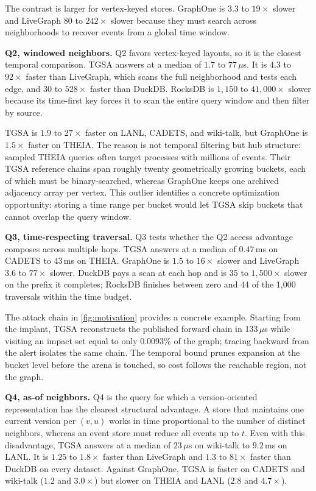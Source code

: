 \documentclass[sigconf,nonacm]{acmart}
\newcommand{\sys}{TGSA\xspace}
\begin{document}
The contrast is larger for vertex-keyed stores. GraphOne is $3.3$ to
$19\times$ slower and LiveGraph $80$ to $242\times$ slower because
they must search across neighborhoods to recover events from a global
time window.

\textbf{Q2, windowed neighbors.} Q2 favors vertex-keyed layouts, so it
is the closest temporal comparison. \sys answers at a median of
$1.7$ to $77$\,$\mu$s. It is $4.3$ to $92\times$ faster than LiveGraph,
which scans the full neighborhood and tests each edge, and $30$ to
$528\times$ faster than DuckDB. RocksDB is $1{,}150$ to $41{,}000\times$ slower
because its time-first key forces it to scan the entire query window
and then filter by source.

\sys is $1.9$ to
$27\times$ faster on LANL, CADETS, and wiki-talk, but GraphOne is
$1.5\times$ faster on THEIA. The reason is not temporal filtering but
hub structure: sampled THEIA queries often target processes with
millions of events. Their \sys reference chains span roughly twenty
geometrically growing buckets, each of which must be binary-searched,
whereas GraphOne keeps one archived adjacency array per vertex. This
outlier identifies a concrete optimization opportunity: storing a time
range per bucket would let \sys skip buckets that cannot overlap the
query window.

\textbf{Q3, time-respecting traversal.} Q3 tests whether the Q2 access
advantage composes across multiple hops. \sys answers at a median of
$0.47$\,ms on CADETS to $43$\,ms on THEIA. GraphOne is $1.5$ to
$16\times$ slower and LiveGraph $3.6$ to $77\times$ slower. DuckDB
pays a scan at each hop and is $35$ to $1{,}500\times$ slower on the
prefix it completes; RocksDB finishes between zero and 44 of the
1{,}000 traversals within the time budget.

The attack chain in \cref{fig:motivation} provides a concrete example.
Starting from the implant, \sys reconstructs the published forward
chain in 133\,$\mu$s while visiting an impact set equal to only
0.0093\% of the graph; tracing backward from the alert isolates the
same chain. The temporal bound prunes expansion at the bucket level before
the arena is touched, so cost follows the reachable region, not the
graph.

\textbf{Q4, as-of neighbors.} Q4 is the query for which a
version-oriented representation has the clearest structural advantage.
A store that maintains one current version per $(v,u)$ works in time
proportional to the number of distinct neighbors, whereas an event
store must reduce all events up to $t$. Even with this disadvantage,
\sys answers at a median of $23$\,$\mu$s on wiki-talk to $9.2$\,ms on
LANL. It is $1.25$ to $1.8\times$ faster than LiveGraph and $1.3$ to
$81\times$ faster than DuckDB on every dataset. Against GraphOne, \sys
is faster on CADETS and wiki-talk ($1.2$ and $3.0\times$) but slower on
THEIA and LANL ($2.8$ and $4.7\times$).
\end{document}
